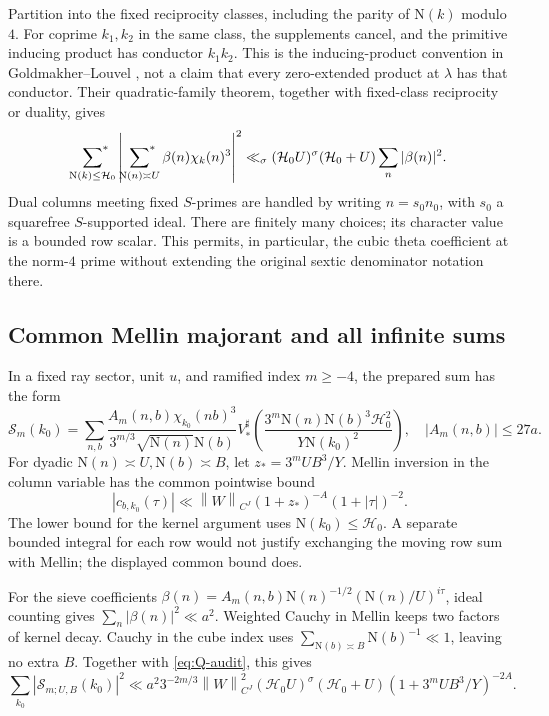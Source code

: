 \documentclass[11pt]{article}
\numberwithin{equation}{section}
\theoremstyle{definition}
\theoremstyle{remark}
\newcommand{\N}{\mathrm N}
\newcommand{\norm}[1]{\left\|#1\right\|}
\newcommand{\sfstar}{\sideset{}{^*}\sum}
\begin{document}
Partition into the fixed reciprocity classes, including the parity
of \(\N(k)\) modulo \(4\). For coprime \(k_1,k_2\) in the same
class, the supplements cancel, and the primitive inducing product
has conductor \(k_1k_2\). This is the inducing-product convention
in Goldmakher--Louvel \cite{GL}, not a claim that every
zero-extended product at \(\lambda\) has that conductor.
Their quadratic-family theorem, together with fixed-class
reciprocity or duality, gives
\begin{equation}\label{eq:Q-audit}
 \sfstar_{\N(k)\le\mathcal H_0}
 \left|\sfstar_{\N(n)\asymp U}\beta(n)\chi_k(n)^3\right|^2
 \ll_\sigma(\mathcal H_0U)^\sigma
                    (\mathcal H_0+U)\sum_n|\beta(n)|^2.
\end{equation}
Dual columns meeting fixed \(S\)-primes are handled by writing
\(n=s_0n_0\), with \(s_0\) a squarefree \(S\)-supported ideal.
There are finitely many choices; its character value is a bounded
row scalar. This permits, in particular, the cubic theta coefficient
at the norm-\(4\) prime without extending the original sextic
denominator notation there.

\subsection{Common Mellin majorant and all infinite sums}

In a fixed ray sector, unit \(u\), and ramified index \(m\ge-4\),
the prepared sum has the form
\[
 \mathscr S_m(k_0)=
 \sum_{n,b}\frac{A_m(n,b)\chi_{k_0}(nb)^3}
                   {3^{m/3}\sqrt{\N(n)}\N(b)}
 V_*^\sharp\!\left(
  \frac{3^m\N(n)\N(b)^3\mathcal H_0^2}{Y\N(k_0)^2}\right),
 \quad |A_m(n,b)|\le27a .
\]
For dyadic \(\N(n)\asymp U,\N(b)\asymp B\), let
\(z_*=3^mUB^3/Y\). Mellin inversion in the column variable
has the common pointwise bound
\[
 |c_{b,k_0}(\tau)|\ll
 \norm{W}_{C^J}(1+z_*)^{-A}(1+|\tau|)^{-2}.
\]
The lower bound for the kernel argument uses
\(\N(k_0)\le\mathcal H_0\). A separate bounded integral for each
row would not justify exchanging the moving row sum with Mellin;
the displayed common bound does.

For the sieve coefficients
\(\beta(n)=A_m(n,b)\N(n)^{-1/2}(\N(n)/U)^{i\tau}\),
ideal counting gives \(\sum_n|\beta(n)|^2\ll a^2\).
Weighted Cauchy in Mellin keeps two factors of kernel decay.
Cauchy in the cube index uses
\(\sum_{\N(b)\asymp B}\N(b)^{-1}\ll1\), leaving no extra \(B\).
Together with \eqref{eq:Q-audit}, this gives
\begin{equation}\label{eq:block-completed}
 \sum_{k_0}|\mathscr S_{m;U,B}(k_0)|^2
 \ll a^2 3^{-2m/3}\norm{W}_{C^J}^2
  (\mathcal H_0U)^\sigma(\mathcal H_0+U)
  (1+3^mUB^3/Y)^{-2A}.
\end{equation}
\end{document}
